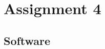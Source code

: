 \section{Assignment 4}
\clearpage

\subsection{Software}
\inputminted{cpp}{../leds-wifi/main/leds-wifi.cpp}
\clearpage
